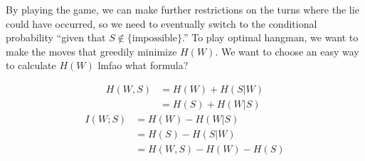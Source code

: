     By playing the game, we can make further restrictions on the turns where the lie could have occurred, so we need to eventually switch to the conditional probability ``given that $S \not\in \{\text{impossible}\}$.'' To play optimal hangman, we want to make the moves that greedily minimize $H(W)$. We want to choose an easy way to calculate $H(W)$ lmfao what formula?

    \begin{align*}
        H(W,S) &= H(W) + H(S|W) \\
        &= H(S) + H(W|S)
    \end{align*}
    \begin{align*}
        I(W;S) &= H(W) - H(W|S) \\
        &= H(S) - H(S|W) \\
        &= H(W,S) - H(W) - H(S)
    \end{align*}


